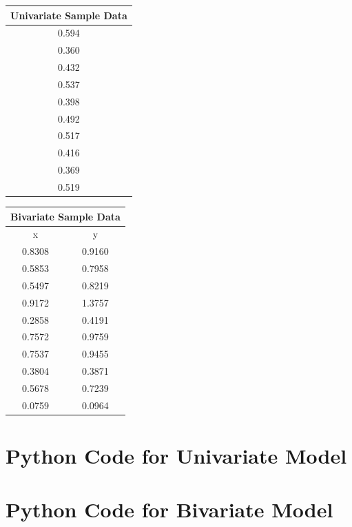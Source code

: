\documentclass[a4paper,11pt,twoside]{article}
\begin{document}
\begin{tabular}[t]{|c|}
	\hline
	Univariate Sample Data \\
	\hline
	0.594 \\
	0.360 \\
	0.432 \\
	0.537 \\
	0.398 \\
	0.492 \\
	0.517 \\
	0.416 \\
	0.369 \\
	0.519 \\
	\hline
\end{tabular}
\quad
\begin{tabular}[t]{|c|c|}
	\hline
	\multicolumn{2}{|c|}{Bivariate Sample Data} \\
	\hline
	x & y \\ 
	\hline 
	0.8308 & 0.9160 \\
	0.5853 & 0.7958 \\
	0.5497 & 0.8219 \\
	0.9172 & 1.3757 \\
	0.2858 & 0.4191 \\
	0.7572 & 0.9759 \\
	0.7537 & 0.9455 \\
	0.3804 & 0.3871 \\
	0.5678 & 0.7239 \\
	0.0759 & 0.0964 \\
	\hline
\end{tabular}
	
\section{Python Code for Univariate Model} 
\label{sec:onedcode}


\section{Python Code for Bivariate Model}
\label{sec:twodcode}

\end{document}
